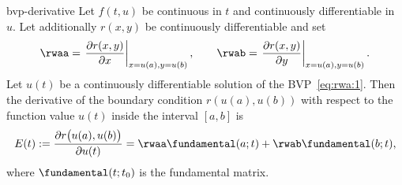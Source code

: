\begin{Lemma}{bvp-derivative}
  Let $f(t,u)$ be continuous in $t$ and continuously differentiable in
  $u$.  Let additionally $r(x,y)$ be continuously differentiable and
  set
  \begin{gather}
    \label{eq:rwa:9}
    \rwaa = \left.\frac{\partial r(x,y)}{\partial
        x}\right|_{x=u(a),y=u(b)},
    \qquad
    \rwab = \left.\frac{\partial r(x,y)}{\partial
        y}\right|_{x=u(a),y=u(b)}.
  \end{gather}
  Let $u(t)$ be a continuously differentiable solution of the
  BVP~\eqref{eq:rwa:1}.  Then the derivative of the boundary condition
  $r(u(a),u(b))$ with respect to the function value $u(t)$ inside the
  interval $[a,b]$ is
  \begin{gather}
    \label{eq:rwa:12}
    E(t)
    := \frac{\partial r\bigl(u(a),u(b)\bigr)}{\partial u(t)}
    = \rwaa \fundamental(a;t) + \rwab \fundamental(b;t),
  \end{gather}
  where $\fundamental(t;t_0)$ is the fundamental matrix.
\end{Lemma}
